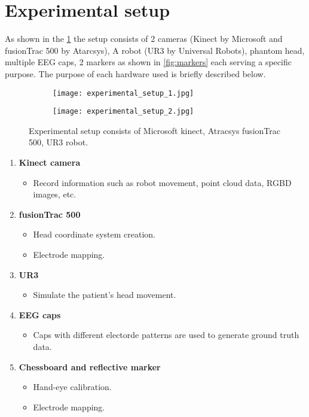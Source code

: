 \section{Experimental setup} As shown in the \cref{fig:Eexperimental_setup} the setup consists of 2 cameras (Kinect by Microsoft and fusionTrac 500 by Atarcsys), A robot (UR3 by Universal Robots), phantom head, multiple EEG caps, 2 markers as shown in \cref{fig:markers} each serving a specific purpose. The purpose of each hardware used is briefly described below.\\

\begin{figure}[hbt!]
	\centering
	\begin{subfigure}{0.49\textwidth}
		\texttt{[image: experimental\_setup\_1.jpg]}	
	\end{subfigure}
	\hfill
	\begin{subfigure}{0.49\textwidth}
		\texttt{[image: experimental\_setup\_2.jpg]}	
	\end{subfigure}
	\caption{Experimental setup consists of Microsoft kinect, Atracsys fusionTrac 500, UR3 robot.} 
	\label{fig:Eexperimental_setup}
\end{figure} 

\begin{enumerate}
	\item \textbf{Kinect camera} 
	\begin{itemize}
		\item Record information such as robot movement, point cloud data, RGBD images, etc.
	\end{itemize}
	\item \textbf{fusionTrac 500} 
	\begin{itemize}
		\item Head coordinate system creation.
		\item Electrode mapping.
	\end{itemize}
	\item \textbf{UR3} 
	\begin{itemize}
		\item Simulate the patient's head movement.
	\end{itemize}
	\item \textbf{EEG caps} 
	\begin{itemize}
		\item Caps with different electorde patterns are used to generate ground truth data.
	\end{itemize}
	\item \textbf{Chessboard and reflective marker} 
	\begin{itemize}
		\item Hand-eye calibration.
		\item Electrode mapping.
	\end{itemize}
\end{enumerate}


